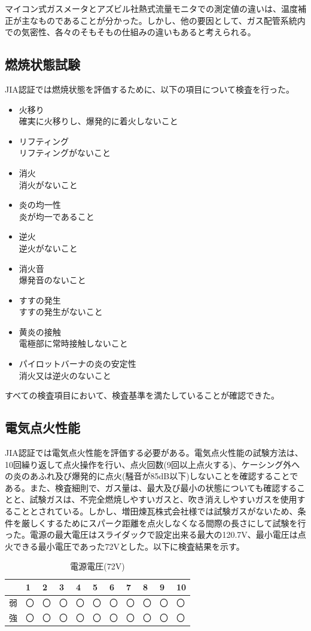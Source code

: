 \documentclass[upLaTeX,11pt]{ujarticle}
\begin{document}
マイコン式ガスメータとアズビル社熱式流量モニタでの測定値の違いは、温度補正が主なものであることが分かった。しかし、他の要因として、ガス配管系統内での気密性、各々のそもそもの仕組みの違いもあると考えられる。
\subsection{燃焼状態試験}
JIA認証では燃焼状態を評価するために、以下の項目について検査を行った。
\begin{itemize}
    \item 火移り\\
    確実に火移りし、爆発的に着火しないこと
    \item リフティング\\
    リフティングがないこと
    \item 消火\\
    消火がないこと
    \item 炎の均一性\\
    炎が均一であること
    \item 逆火\\
    逆火がないこと
    \item 消火音\\
    爆発音のないこと
    \item すすの発生\\
    すすの発生がないこと
    \item 黄炎の接触\\
    電極部に常時接触しないこと
    \item パイロットバーナの炎の安定性\\
    消火又は逆火のないこと
\end{itemize}
すべての検査項目において、検査基準を満たしていることが確認できた。
\subsection{電気点火性能}
JIA認証では電気点火性能を評価する必要がある。電気点火性能の試験方法は、10回繰り返して点火操作を行い、点火回数(9回以上点火する)、ケーシング外への炎のあふれ及び爆発的に点火(騒音が85dB以下)しないことを確認することである。また、検査細則で、ガス量は、最大及び最小の状態についても確認することと、試験ガスは、不完全燃焼しやすいガスと、吹き消えしやすいガスを使用することとされている。しかし、増田煉瓦株式会社様では試験ガスがないため、条件を厳しくするためにスパーク距離を点火しなくなる間際の長さにして試験を行った。電源の最大電圧はスライダックで設定出来る最大の120.7V、最小電圧は点火できる最小電圧であった72Vとした。以下に検査結果を示す。
\begin{table}[H]
    \centering
    \caption{電源電圧(72V)}
    \begin{tabular}{|l|l|l|l|l|l|l|l|l|l|l|}
    \hline
      & 1 & 2 & 3 & 4 & 5 & 6 & 7 & 8 & 9 & 10 \\ \hline
    弱 & 〇 & 〇 & 〇 & 〇 & 〇 & 〇 & 〇 & 〇 & 〇 & 〇  \\ \hline
    強 & 〇 & 〇 & 〇 & 〇 & 〇 & 〇 & 〇 & 〇 & 〇 & 〇  \\ \hline
    \end{tabular}
\end{table}
\end{document}
